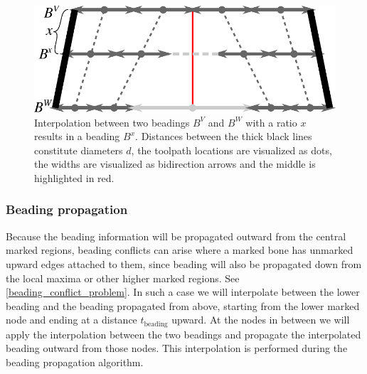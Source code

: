 \begin{figure}
\centering
\includegraphics[width=.8\columnwidth]{sources/method/beading_interpolation_v2.pdf}
\caption{
Interpolation between two beadings $B^V$ and $B^W$ with a ratio $x$ results in a beading $B^x$.
Distances between the thick black lines constitute diameters $d$,
the toolpath locations are visualized as dots,
the widths are visualized as bidirection arrows
and the middle is highlighted in red.
}
\label{beading_interpolation}
\end{figure}


\subsubsection{Beading propagation}\label{section_beading_conflicts}
Because the beading information will be propagated outward from the central marked regions, beading conflicts can arise where a marked bone has unmarked upward edges attached to them, since beading will also be propagated down from the local maxima or other higher marked regions.
See \cref{beading_conflict_problem}.
In such a case we will interpolate between the lower beading and the beading propagated from above,
starting from the lower marked node and ending at a distance $t_\text{beading}$ upward.
At the nodes in between we will apply the interpolation between the two beadings and propagate the interpolated beading outward from those nodes.
This interpolation is performed during the beading propagation algorithm.


